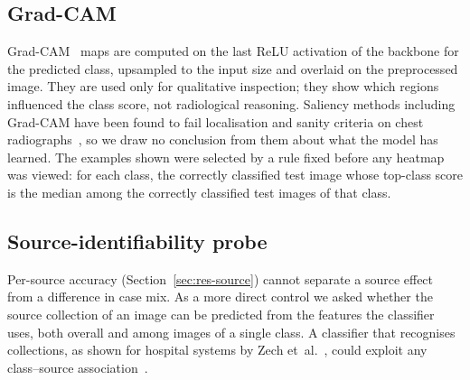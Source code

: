 \subsection{Grad-CAM}
Grad-CAM~\cite{selvaraju2017gradcam} maps are computed on the last ReLU activation of the backbone for the predicted class, upsampled to the input size and overlaid on the preprocessed image. They are used only for qualitative inspection; they show which regions influenced the class score, not radiological reasoning. Saliency methods including Grad-CAM have been found to fail localisation and sanity criteria on chest radiographs~\cite{arun2021assessing}, so we draw no conclusion from them about what the model has learned. The examples shown were selected by a rule fixed before any heatmap was viewed: for each class, the correctly classified test image whose top-class score is the median among the correctly classified test images of that class.

\subsection{Source-identifiability probe}
\label{sec:probe}
Per-source accuracy (Section~\ref{sec:res-source}) cannot separate a source effect from a difference in case mix. As a more direct control we asked whether the source collection of an image can be predicted from the features the classifier uses, both overall and among images of a single class. A classifier that recognises collections, as shown for hospital systems by Zech et~al.~\cite{zech2018variable}, could exploit any class--source association~\cite{degrave2021ai,geirhos2020shortcut}.

